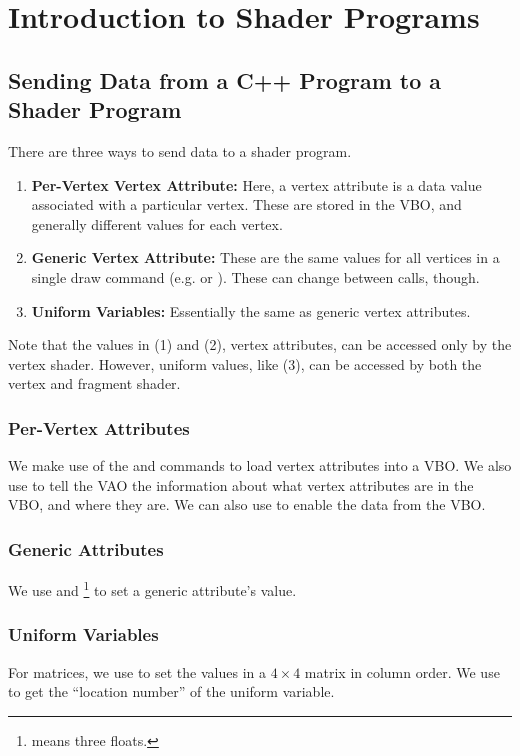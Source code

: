 \documentclass[letterpaper]{article}
\begin{document}
\section{Introduction to Shader Programs}
\subsection{Sending Data from a C++ Program to a Shader Program}
There are three ways to send data to a shader program. 
\begin{enumerate}
    \item \textbf{Per-Vertex Vertex Attribute:} Here, a vertex attribute is a data value associated with a particular vertex. These are stored in the VBO, and generally different values for each vertex. 
    \item \textbf{Generic Vertex Attribute:} These are the same values for all vertices in a single draw command (e.g.  or ). These can change between calls, though. 
    \item \textbf{Uniform Variables:} Essentially the same as generic vertex attributes. 
\end{enumerate}
Note that the values in (1) and (2), vertex attributes, can be accessed only by the vertex shader. However, uniform values, like (3), can be accessed by both the vertex and fragment shader.

\subsubsection{Per-Vertex Attributes}
We make use of the  and  commands to load vertex attributes into a VBO. We also use  to tell the VAO the information about what vertex attributes are in the VBO, and where they are. We can also use  to enable the data from the VBO. 

\subsubsection{Generic Attributes}
We use  and \footnote{ means three floats.} to set a generic attribute's value. 

\subsubsection{Uniform Variables}
For matrices, we use  to set the values in a $4 \times 4$ matrix in column order. We use  to get the ``location number'' of the uniform variable.
\end{document}
